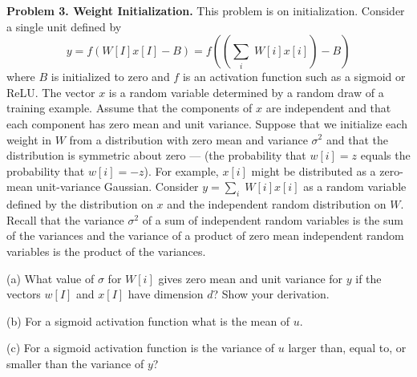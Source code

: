 \documentclass{article}
\newcommand{\solution}[1]{}
\begin{document}
\medskip
{\bf Problem 3. Weight Initialization.}  This problem is on initialization.  Consider a single unit defined by
$$y = f(W[I]x[I] - B) = f\left(\left(\sum_i\;W[i]x[i]\right) - B\right)$$
where $B$ is initialized to zero and $f$ is an activation function such as a sigmoid or ReLU.
The vector $x$ is a random variable determined by a random draw of a training example.
Assume that the components of $x$ are independent and that each component has zero mean and unit variance.
Suppose that we initialize each weight in $W$ from a distribution with
zero mean and variance $\sigma^2$ and that the distribution is symmetric about zero --- (the probability that $w[i] = z$ equals the probability that $w[i] = -z$).
For example, $x[i]$ might be distributed as a zero-mean unit-variance Gaussian.
Consider $y = \sum_i\;W[i]x[i]$ as a random variable defined by the distribution on $x$ and the independent random distribution on $W$.
Recall that the variance $\sigma^2$ of
a sum of independent random variables is the sum of the variances and the variance of a product of zero mean independent
random variables is the product of the variances.

\medskip
(a) What value of $\sigma$ for $W[i]$ gives zero mean and unit variance for $y$ if the vectors $w[I]$ and $x[I]$ have dimension $d$?  Show your derivation.

\solution{Let $\sigma^2$ be the variance of $x[i]$.  We then have that the variance of $\sum_i W[i]x[i]$ is $\sum_i \sigma^2 = d \sigma^2$.
  Setting $d\sigma^2$ equal to 1 gives
  $$\sigma = \frac{1}{\sqrt{d}}$$
}


\medskip
(b) For a sigmoid activation function what is the mean of $u$.

\solution{
  We are given that the probability that $W[i] = z$ is the same as the probability of $w[i]= -z$.  This implies that for a given value of
  $x[i]$ we have that the probability that $w[i]x[i] = z$ equals the probability that $w[i]x[i] = -z$.  This further implies that, for a given value $y$, the
  probability that $\sum_i w[i]z[i] = y$ equals the probability that $\sum_i w[i]x[i] = -y$.  So the input to the sigmoid is distributed symmetrically about 0.
  Since the sigmoid function is itself symmetric about 0, we get that the expected value of the output of the sigmoid is its value at zero which is 1/2.
}

\medskip
(c) For a sigmoid activation function
is the variance of $u$ larger than, equal to, or smaller than the variance of $y$?

\solution{
  The variance is smaller.  To show this it suffices to show that the slope of the sigmoid function is everywhere less than 1.  The slope is largest at the input zero.
  The sigmoid function is
  $$f(z) = \frac{1}{1 + e^{-y}}$$
  The slope is
  $$f'(y) = \frac{e^{-y}}{(1+e^{-y})^2}$$
  which equals $1/4$ at $y = 0$.
}
\end{document}
